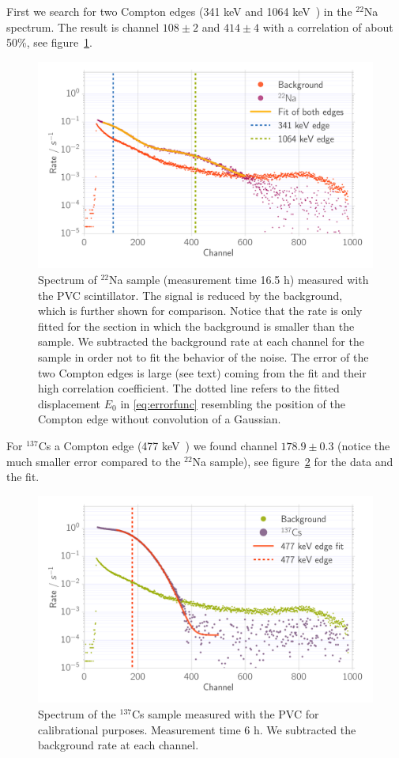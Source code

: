 First we search for two Compton edges (341 keV and
1064 keV~\cite{nist}) in the $^{22}$Na spectrum. The result is
channel $108 \pm 2$ and $414 \pm 4$ with a correlation of about 50\%, see
figure~\ref{fig:calib_ps_na}.

\begin{figure}[htpb]
    \centering
    \includegraphics[width=0.9\linewidth]{./analysis/figures/calib_ps_na}
    \caption{Spectrum of $^{22}$Na sample (measurement time
    16.5 h) measured with the PVC scintillator.
    The signal is reduced by the background, which is further shown for comparison. 
    Notice that the rate is only fitted for the section in which the background is
    smaller than the sample. We
    subtracted the background rate at each channel
    for the sample in order not to fit the 
    behavior of the noise. The error of the two
    Compton edges is large (see text) coming
    from the fit and their high correlation coefficient. The 
    dotted line refers to the fitted displacement $E_0$ in \eqref{eq:errorfunc} 
    resembling the position of the Compton edge without convolution of a Gaussian. 
    }
    \label{fig:calib_ps_na}
\end{figure}

For $^{137}$Cs a Compton edge (477 keV~\cite{nist})
we found channel $178.9 \pm 0.3$ 
(notice the much smaller error compared to the $^{22}$Na sample), 
see figure~\ref{fig:calib_ps_cs} for the data and the fit.
\begin{figure}[htpb]
    \centering
    \includegraphics[width=0.9\linewidth]{./analysis/figures/calib_ps_cs}
    \caption{Spectrum of the $^{137}$Cs sample measured with the PVC for calibrational purposes. Measurement time
    6 h. We subtracted the background rate at each channel. }
\label{fig:calib_ps_cs}
\end{figure}

